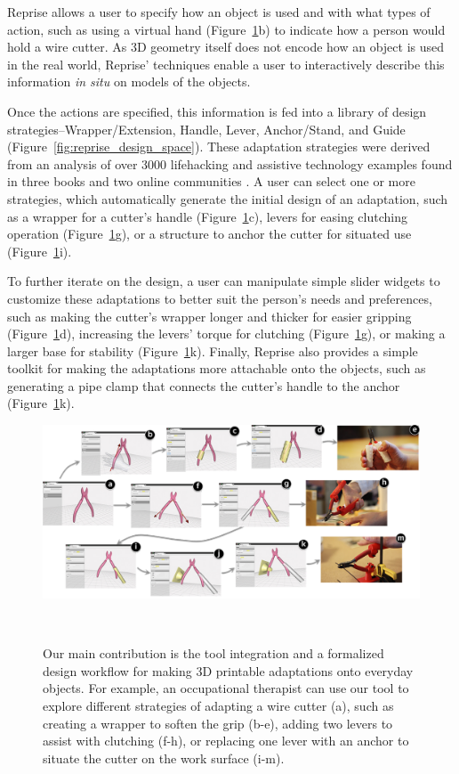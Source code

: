 Reprise allows a user to specify how an object is used and with what types of action, such as using a virtual hand (Figure~\ref{fig:reprise_teaser}b) to indicate how a person would hold a wire cutter. As 3D geometry itself does not encode how an object is used in the real world, Reprise' techniques enable a user to interactively describe this information \textit{in situ} on models of the objects.

Once the actions are specified, this information is fed into a library of design strategies--Wrapper/Extension, Handle, Lever, Anchor/Stand, and Guide (Figure~\ref{fig:reprise_design_space}). These adaptation strategies were derived from an analysis of over 3000 lifehacking and assistive technology examples found in three books \cite{plaxen2005adapt, willkolmm2013assistive, robitaille2010illustrated} and two online communities \cite{thingiverse,pinterest}. A user can select one or more strategies, which automatically generate the initial design of an adaptation, such as a wrapper for a cutter's handle (Figure~\ref{fig:reprise_teaser}c), levers for easing  clutching operation (Figure~\ref{fig:reprise_teaser}g), or a structure to anchor the cutter for situated use (Figure~\ref{fig:reprise_teaser}i).

To further iterate on the design, a user can manipulate simple slider widgets to customize these adaptations to better suit the person's needs and preferences, such as making the cutter's wrapper longer and thicker for easier gripping (Figure~\ref{fig:reprise_teaser}d), increasing the levers' torque for clutching (Figure~\ref{fig:reprise_teaser}g), or making a larger base for stability (Figure~\ref{fig:reprise_teaser}k). Finally, Reprise also provides a simple toolkit for making the adaptations more attachable onto the objects, such as generating a pipe clamp that connects the cutter's handle to the anchor (Figure~\ref{fig:reprise_teaser}k).

\begin{figure}
  \centering
  \includegraphics[width=1\textwidth]{figures/reprise_scenarios_v1.pdf}
  \caption{Our main contribution is the tool integration and a formalized design workflow for making 3D printable adaptations onto everyday objects. For example, an occupational therapist can use our tool to explore different strategies of adapting a wire cutter (a), such as creating a wrapper to soften the grip (b-e), adding two levers to assist with clutching (f-h), or replacing one lever with an anchor to situate the cutter on the work surface (i-m).}~\label{fig:reprise_teaser}
\end{figure}

